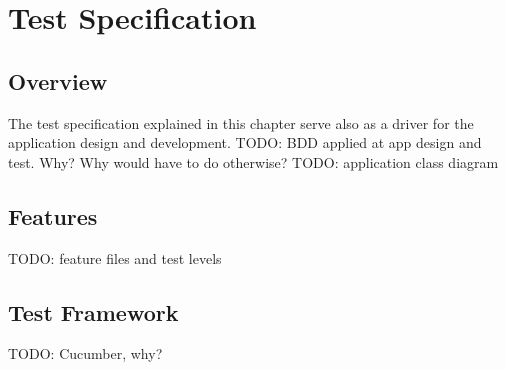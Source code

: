 
\chapter{Test Specification} %

\label{Chapter2} %




\section{Overview}
The test specification explained in this chapter serve also as a driver for the application design and development. 
TODO: BDD applied at app design and test. Why? Why would have to do otherwise?
TODO: application class diagram


\section{Features}
TODO: feature files and test levels



\section{Test Framework}
TODO: Cucumber, why?

